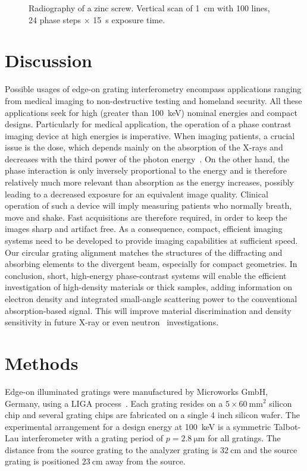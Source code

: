 \begin{figure}[hbt]
    \centering
    
    \caption[Radiography of a zinc screw.]{Radiography of a zinc screw.
        Vertical scan of \SI{1}{\centi\metre} with \num{100} lines,
        \num{24} phase steps $\times$ \SI{15}{\second} exposure time.}
    \label{fig:screw}
\end{figure}

\section{Discussion}
Possible usages of edge-on grating interferometry encompass applications
ranging from medical imaging to non-destructive testing and homeland
security. All these applications seek for high (greater than
\SI{100}{\kilo\eV}) nominal energies
and compact designs. Particularly for medical application, the operation of
a phase contrast imaging device at high energies is imperative. When imaging
patients, a crucial issue is the dose, which depends mainly on the
absorption of the X-rays and decreases with the third power of the photon
energy~\parencite{Momose2005}. On the other hand, the phase interaction is only inversely
proportional to the energy and is therefore relatively much more relevant
than absorption as the energy increases, possibly leading to a decreased
exposure for an equivalent image quality. Clinical operation of such a
device will imply measuring patients who normally breath, move and shake.
Fast acquisitions are therefore required, in order to keep the images sharp
and artifact free. As a consequence, compact, efficient imaging systems need
to be developed to provide imaging capabilities at sufficient speed. Our
circular grating alignment matches the structures of the diffracting and
absorbing elements to the divergent beam, especially for compact geometries.
In conclusion, short, high-energy phase-contrast systems will enable the
efficient investigation of high-density materials or thick samples, adding
information on electron density and integrated small-angle scattering power
to the conventional absorption-based signal. This will improve material
discrimination and density sensitivity in future X-ray or even
neutron~\parencite{Grunzweig2008} investigations.

\section{Methods}
Edge-on illuminated gratings were manufactured by Microworks GmbH, Germany, using a LIGA process~\parencite{Kenntner2010}. Each grating
resides on a $5 \times \SI{60}{\milli\metre^2}$ silicon chip and several
grating chips are fabricated on a single 4 inch silicon wafer. The
experimental arrangement for a design energy at \SI{100}{\kilo\electronvolt}
is a symmetric Talbot-Lau interferometer with a grating period of $p =
\SI{2.8}{\micro \metre}$ for all gratings. The distance from the source
grating to the analyzer grating is $\SI{32}{\centi\metre}$ and the source
grating is positioned $\SI{23}{\centi\metre}$ away from the source.

